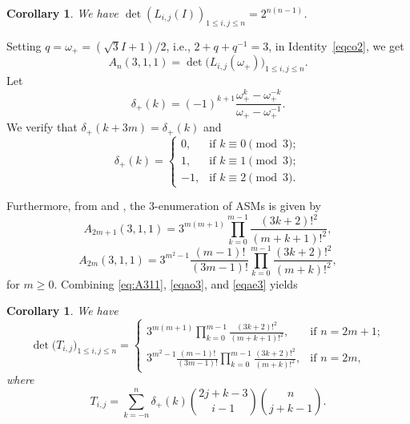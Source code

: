 \documentclass[12pt, a4paper]{amsart} %
\numberwithin{equation}{section}
\newtheorem{corollary}[theorem]{Corollary}
\begin{document}
\begin{corollary}\label{co12}
	We have
$	\det{(L_{i,j}(I))_{1 \le i,j \le n}}=2^{n(n-1)}$.
\end{corollary}


Setting  $q=\omega_{+}=({\sqrt{3}I + 1})/{2}$, i.e.,  $2+q+q^{-1}=3$, in 
Identity~\eqref{eqco2}, we get
\begin{equation}\label{eq:A311}
  A_{n}(3,1,1)
	= {\det\bigl( L_{i,j}(\omega_{+}) \bigr)_{1 \le i,j \le n}}.
\end{equation}
Let
\begin{equation*}
	\delta_{+}(k) =  (-1)^{k+1}\frac{\omega_{+}^k- \omega_{+}^{-k}}{\omega_{+}- \omega_{+}^{-1}}. 
\end{equation*}
We verify that $\delta_{+}(k+3m) = \delta_{+}(k)$ and
$$
\delta_{+}(k) = 
\begin{cases}
0, & \text{if } k \equiv 0 \pmod{3}; \\
1, & \text{if } k \equiv 1 \pmod{3}; \\
-1, & \text{if } k \equiv 2 \pmod{3}.
\end{cases}
$$

Furthermore, from \cite{Ku96} and \cite{MRR2},  the $3$-enumeration of ASMs is given by 
\begin{equation}\label{eqao3}
    A_{2m+1}(3,1,1)=3^{m(m+1)}\prod_{k=0}^{m-1}\frac{(3k+2)!^2}{(m+k+1)!^2},
\end{equation}
\begin{equation}\label{eqae3}
    A_{2m}(3,1,1)=3^{m^2-1}\frac{(m-1)!}{(3m-1)!}\prod_{k=0}^{m-1}\frac{(3k+2)!^2}{(m+k)!^2},
\end{equation}
for $m \geq 0$. Combining \eqref{eq:A311}, \eqref{eqao3}, and \eqref{eqae3} yields

\begin{corollary} 
We have
\begin{equation*}
\det{\bigl(T_{i,j}\bigr)_{1 \le i,j \le n}}
=
\begin{cases}
\displaystyle{3^{m(m+1)}\prod_{k=0}^{m-1}\frac{(3k+2)!^2}{(m+k+1)!^2}}, &\text{if $n=2m+1$}; \\[15pt]
\displaystyle{ 3^{m^2-1} \frac{(m-1)!}{(3m-1)!}\prod_{k=0}^{m-1}\frac{(3k+2)!^2}{(m+k)!^2}}, &\text{if $n=2m$},
\end{cases}
\end{equation*}
where
$$
T_{i,j}=\sum_{k=-n}^{n}\delta_{+}(k)\binom{2j+k-3}{i-1}\binom{n}{j+k-1}.
$$

\end{corollary}
\end{document}
